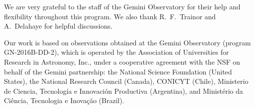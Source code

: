 \documentclass[twocolumn]{aastex61}
\def \frb {FRB Search Algorithm}
\begin{document}







\acknowledgements 
We are very grateful to the staff of the Gemini Observatory for their help and flexibility throughout this program. We also thank R.~F.~Trainor and A.~Delahaye for helpful discussions.

Our work is based on observations obtained at the Gemini Observatory (program GN-2016B-DD-2), which is operated by the Association of Universities for Research in Astronomy, Inc., under a cooperative agreement with the NSF on behalf of the Gemini partnership: the National Science Foundation (United States), the National Research Council (Canada), CONICYT (Chile), Ministerio de Ciencia, Tecnolog\'{i}a e Innovaci\'{o}n Productiva (Argentina), and Minist\'{e}rio da Ci\^{e}ncia, Tecnologia e Inova\c{c}\~{a}o (Brazil). 
\end{document}
